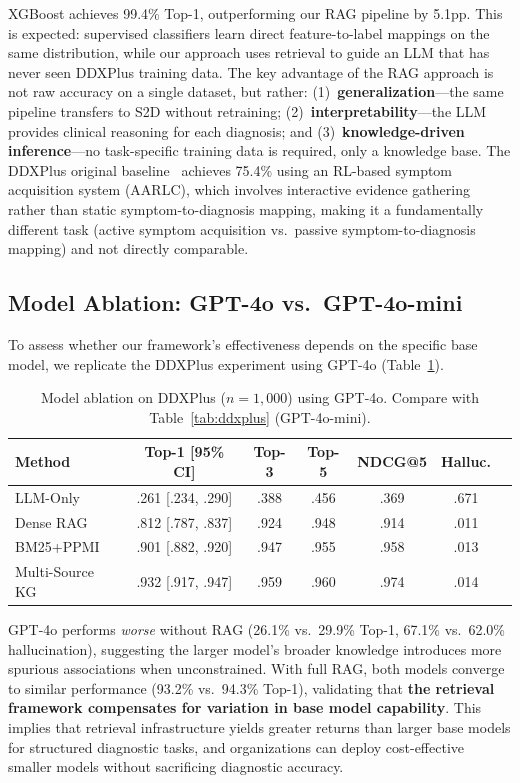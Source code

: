 \documentclass[runningheads]{llncs}
\begin{document}
XGBoost achieves 99.4\% Top-1, outperforming our RAG pipeline by 5.1pp. This is expected: supervised classifiers learn direct feature-to-label mappings on the same distribution, while our approach uses retrieval to guide an LLM that has never seen DDXPlus training data. The key advantage of the RAG approach is not raw accuracy on a single dataset, but rather: (1)~\textbf{generalization}---the same pipeline transfers to S2D without retraining; (2)~\textbf{interpretability}---the LLM provides clinical reasoning for each diagnosis; and (3)~\textbf{knowledge-driven inference}---no task-specific training data is required, only a knowledge base. The DDXPlus original baseline~\cite{fansi2022ddxplus} achieves 75.4\% using an RL-based symptom acquisition system (AARLC), which involves interactive evidence gathering rather than static symptom-to-diagnosis mapping, making it a fundamentally different task (active symptom acquisition vs.\ passive symptom-to-diagnosis mapping) and not directly comparable.

\subsection{Model Ablation: GPT-4o vs.\ GPT-4o-mini}
\label{sec:model_ablation}

To assess whether our framework's effectiveness depends on the specific base model, we replicate the DDXPlus experiment using GPT-4o (Table~\ref{tab:gpt4o}).

\begin{table}[t]
\centering
\caption{Model ablation on DDXPlus ($n{=}1{,}000$) using GPT-4o. Compare with Table~\ref{tab:ddxplus} (GPT-4o-mini).}
\label{tab:gpt4o}
\begin{tabular}{lcccccc}
\toprule
\textbf{Method} & \textbf{Top-1 [95\% CI]} & \textbf{Top-3} & \textbf{Top-5} & \textbf{NDCG@5} & \textbf{Halluc.} \\
\midrule
LLM-Only       & .261 [.234, .290] & .388 & .456 & .369 & .671 \\
Dense RAG       & .812 [.787, .837] & .924 & .948 & .914 & .011 \\
BM25+PPMI       & .901 [.882, .920] & .947 & .955 & .958 & .013 \\
Multi-Source KG & .932 [.917, .947] & .959 & .960 & .974 & .014 \\
\bottomrule
\end{tabular}
\end{table}

GPT-4o performs \emph{worse} without RAG (26.1\% vs.\ 29.9\% Top-1, 67.1\% vs.\ 62.0\% hallucination), suggesting the larger model's broader knowledge introduces more spurious associations when unconstrained. With full RAG, both models converge to similar performance (93.2\% vs.\ 94.3\% Top-1), validating that \textbf{the retrieval framework compensates for variation in base model capability}. This implies that retrieval infrastructure yields greater returns than larger base models for structured diagnostic tasks, and organizations can deploy cost-effective smaller models without sacrificing diagnostic accuracy.
\end{document}
